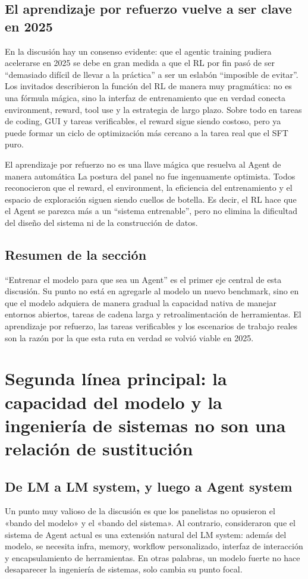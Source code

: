 \documentclass[a4paper]{article}
\begin{document}
\subsection{El aprendizaje por refuerzo vuelve a ser clave en 2025}

En la discusión hay un consenso evidente: que el agentic training pudiera acelerarse en 2025 se debe en gran medida a que el RL por fin pasó de ser ``demasiado difícil de llevar a la práctica'' a ser un eslabón ``imposible de evitar''. Los invitados describieron la función del RL de manera muy pragmática: no es una fórmula mágica, sino la interfaz de entrenamiento que en verdad conecta environment, reward, tool use y la estrategia de largo plazo. Sobre todo en tareas de coding, GUI y tareas verificables, el reward sigue siendo costoso, pero ya puede formar un ciclo de optimización más cercano a la tarea real que el SFT puro.

\begin{warningbox}{El aprendizaje por refuerzo no es una llave mágica que resuelva al Agent de manera automática}
La postura del panel no fue ingenuamente optimista. Todos reconocieron que el reward, el environment, la eficiencia del entrenamiento y el espacio de exploración siguen siendo cuellos de botella. Es decir, el RL hace que el Agent se parezca más a un ``sistema entrenable'', pero no elimina la dificultad del diseño del sistema ni de la construcción de datos.
\end{warningbox}

\subsection{Resumen de la sección}

``Entrenar el modelo para que sea un Agent'' es el primer eje central de esta discusión. Su punto no está en agregarle al modelo un nuevo benchmark, sino en que el modelo adquiera de manera gradual la capacidad nativa de manejar entornos abiertos, tareas de cadena larga y retroalimentación de herramientas. El aprendizaje por refuerzo, las tareas verificables y los escenarios de trabajo reales son la razón por la que esta ruta en verdad se volvió viable en 2025.
\section{Segunda línea principal: la capacidad del modelo y la ingeniería de sistemas no son una relación de sustitución}

\subsection{De LM a LM system, y luego a Agent system}
Un punto muy valioso de la discusión es que los panelistas no opusieron el «bando del modelo» y el «bando del sistema». Al contrario, consideraron que el sistema de Agent actual es una extensión natural del LM system: además del modelo, se necesita infra, memory, workflow personalizado, interfaz de interacción y encapsulamiento de herramientas. En otras palabras, un modelo fuerte no hace desaparecer la ingeniería de sistemas, solo cambia su punto focal.
\end{document}
